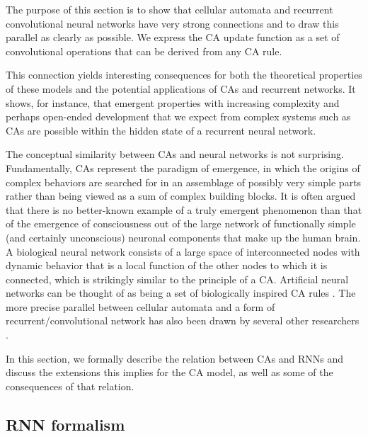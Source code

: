 The purpose of this section is to show that cellular automata and recurrent
convolutional neural networks have very strong connections and to draw this
parallel as clearly as possible. We express the \ac{CA} update function as a set
of convolutional operations that can be derived from any \ac{CA} rule.

This connection yields interesting consequences for both the theoretical
properties of these models and the potential applications of \acp{CA} and
recurrent networks. It shows, for instance, that emergent properties with
increasing complexity and perhaps open-ended development that we expect from
complex systems such as \acp{CA} are possible within the hidden state of a
recurrent neural network.

The conceptual similarity between \acp{CA} and neural networks is not surprising. 
Fundamentally, \acp{CA} represent the paradigm of emergence, in which
the origins of complex behaviors are searched for in an assemblage of possibly
very simple parts rather than being viewed as a sum of complex building blocks. It is
often argued that there is no better-known example of a truly emergent
phenomenon than that of the emergence of consciousness out of the large network
of functionally simple (and certainly unconscious) neuronal components that make
up the human brain. A biological neural network consists of a
large space of interconnected nodes with dynamic behavior that is a local
function of the other nodes to which it is connected, which is strikingly similar
to the principle of a \ac{CA}. Artificial neural networks can
be thought of as being a set of biologically inspired CA rules
\parencite{ilachinskiCellularAutomataDiscrete2001}. The more precise parallel
between cellular automata and a form of recurrent/convolutional network has also
been drawn by several other researchers
\parencite{wulffLearningCellularAutomaton1993,
  gilpinCellularAutomataConvolutional2018,
  mordvintsevGrowingNeuralCellular2020}.

In this section, we formally describe the relation between \acp{CA} and \acp{RNN}
and discuss the extensions this implies for the \ac{CA} model, as well as some of
the consequences of that relation.

\subsection{RNN formalism}

